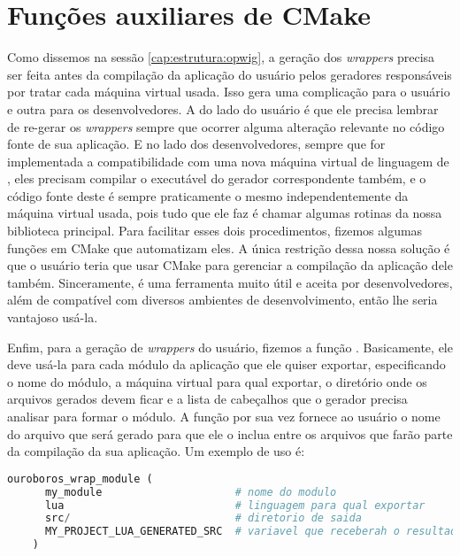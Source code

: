   \section{Funções auxiliares de CMake}
  \label{cap:atividades:cmake}
  
    Como dissemos na sessão \ref{cap:estrutura:opwig}, a geração dos
    \textit{wrappers} precisa ser feita antes da compilação da aplicação do
    usuário pelos geradores responsáveis por tratar cada máquina virtual usada.
    Isso gera uma complicação para o usuário e outra para os desenvolvedores. A
    do lado do usuário é que ele precisa lembrar de re-gerar os
    \textit{wrappers} sempre que ocorrer alguma alteração relevante no código
    fonte de sua aplicação. E no lado dos desenvolvedores, sempre que for
    implementada a compatibilidade com uma nova máquina virtual de linguagem de
    \script{}, eles precisam compilar o executável do gerador correspondente também,
    e o código fonte deste é sempre praticamente o mesmo independentemente da máquina
    virtual usada, pois tudo que ele faz é chamar algumas rotinas da nossa biblioteca
    principal. Para facilitar esses dois procedimentos, fizemos algumas funções em
    CMake que automatizam eles. A única restrição dessa nossa solução é que o usuário teria
    que usar CMake para gerenciar a compilação da aplicação dele também. Sinceramente,
    é uma ferramenta muito útil e aceita por desenvolvedores, além de compatível com
    diversos ambientes de desenvolvimento, então lhe seria vantajoso usá-la.
    
    Enfim, para a geração de \textit{wrappers} do usuário, fizemos a função
    . Basicamente, ele deve usá-la para cada módulo
    da aplicação que ele quiser exportar, especificando o nome do módulo, a
    máquina virtual para qual exportar, o diretório onde os arquivos gerados
    devem ficar e a lista de cabeçalhos que o gerador precisa analisar para formar
    o módulo. A função por sua vez fornece ao usuário o nome do arquivo que
    será gerado para que ele o inclua entre os arquivos que farão parte da
    compilação da sua aplicação. Um exemplo de uso é:

    \vspace{1em}
    
  \begin{lstlisting}[language=python]
    ouroboros_wrap_module (
      my_module                     # nome do modulo
      lua                           # linguagem para qual exportar
      src/                          # diretorio de saida
      MY_PROJECT_LUA_GENERATED_SRC  # variavel que receberah o resultado
    )
  \end{lstlisting}

